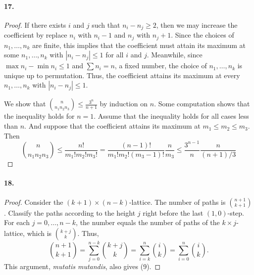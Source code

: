   \paragraph{17.}
  \begin{proof}
    If there exists $i$ and $j$ such that $n_i-n_j\ge 2$, then we may increase
    the coefficient by replace $n_i$ with $n_i-1$ and $n_j$ with $n_j+1$. Since
    the choices of $n_1,\dots,n_k$ are finite, this implies that the 
    coefficient must attain its maximum at some $n_1,\dots,n_k$ with $|n_i-n_j|
    \le 1$ for all $i$ and $j$. Meanwhile, since $\max n_i-\min n_i\le 1$ and
    $\sum n_i=n$, a fixed number, the choice of $n_1,\dots,n_k$ is unique up to
    permutation. Thus, the coefficient attains its maximum at every $n_1,\dots,
    n_k$ with $|n_i-n_j|\le 1$.\par
    We show that $\binom{n}{n_1n_2n_3}\le\frac{3^n}{n+1}$ by induction on $n$.
    Some computation shows that the inequality holds for $n=1$. Assume that 
    the inequality holds for all cases less than $n$. And suppose that the
    coefficient attains its maximum at $m_1\le m_2\le m_3$. Then
    \[
      \binom{n}{n_1n_2n_3}\le
      \frac{n!}{m_1!m_2!m_3!}=
      \frac{(n-1)!}{m_1!m_2!(m_3-1)!}\frac{n}{m_3}\le
      \frac{3^{n-1}}{n}\frac{n}{(n+1)/3}
    \]
  \end{proof}
  
  \paragraph{18.}
  \begin{proof}
    Consider the $(k+1)\times(n-k)$-lattice. The number of paths is $\binom{n+
    1}{k+1}$. Classify the paths according to the height $j$ right before the
    last $(1,0)$-step. For each $j=0,\dots,n-k$, the number equals the number
    of paths of the $k\times j$-lattice, which is $\binom{k+j}{k}$. Thus,
    \[
      \binom{n+1}{k+1}=\sum_{j=0}^{n-k}\binom{k+j}{k}
      =\sum_{i=k}^n\binom{i}{k}=\sum_{i=0}^n\binom{i}{k}.
    \]
    This argument, \textit{mutatis mutandis}, also gives (9).
  \end{proof}
















